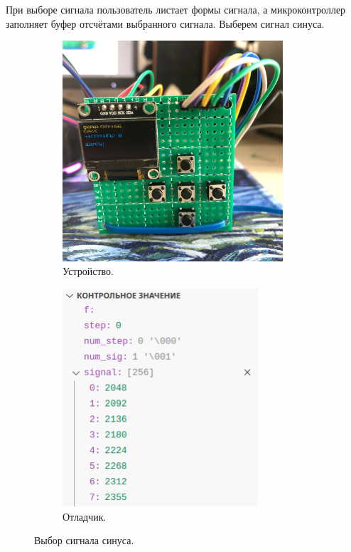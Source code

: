 	При выборе сигнала пользователь листает формы сигнала, а микроконтроллер заполняет буфер отсчётами выбранного сигнала. Выберем сигнал синуса.
	\begin{figure}[H]
     \begin{subfigure}[H]{0.5\textwidth}
         \centering
         \includegraphics[width=0.9\textwidth]{../image/test1_u_s.jpg}
         \caption{Устройство.}
     \end{subfigure}
     \hfill
     \begin{subfigure}[H]{0.5\textwidth}
         \centering
         \includegraphics[width=0.8\textwidth]{../image/test1_o_s.png}
         \caption{Отладчик.}
     \end{subfigure}
        \caption{Выбор сигнала синуса.}
	\end{figure}
	
